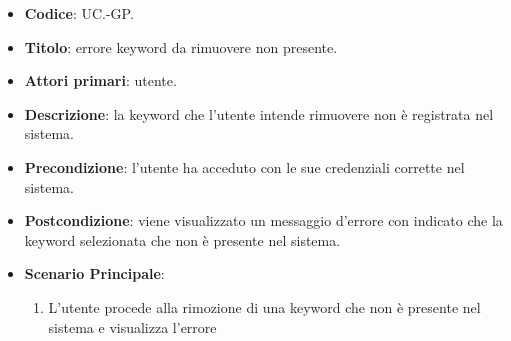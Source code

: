 	\begin{itemize}
		\item \textbf{Codice}: UC\theuccount.\thesubuccount-GP.
		\item \textbf{Titolo}: errore keyword da rimuovere non presente.
		\item \textbf{Attori primari}: utente.
		\item \textbf{Descrizione}: la keyword che l'utente intende rimuovere non è registrata nel sistema.
		\item \textbf{Precondizione}: l’utente ha acceduto con le sue credenziali corrette nel sistema.
		\item \textbf{Postcondizione}: viene visualizzato un messaggio d'errore con indicato che la keyword	selezionata che non è presente nel sistema.
		\item \textbf{Scenario Principale}:
		\begin{enumerate}
			\item L'utente procede alla rimozione di una keyword che non è presente nel sistema e visualizza l'errore
		\end{enumerate}
	\end{itemize}
	